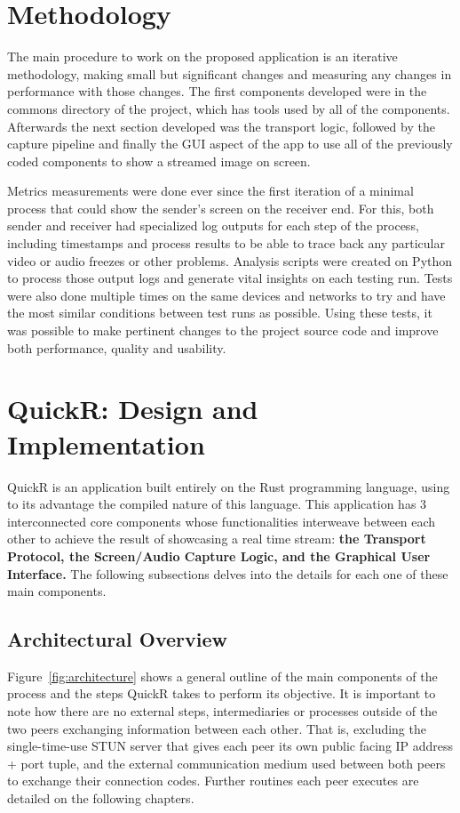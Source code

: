 \documentclass{article}
\begin{document}
\section{Methodology}

The main procedure to work on the proposed application is an iterative methodology, making small but significant changes and measuring any changes in performance with those changes. The first components developed were in the \colorbox{gray!30}{commons} directory of the project, which has tools used by all of the components. Afterwards
the next section developed was the transport logic, followed by the capture pipeline and finally the GUI aspect of the app to use all of the previously coded components to show a streamed image on screen.

Metrics measurements were done ever since the first iteration of a minimal process that could show the sender's screen on the receiver end. For this, both sender and receiver had specialized log outputs for each step of the process, including timestamps and process results to be able to trace back any particular video or audio freezes or other problems. Analysis scripts were created
on Python to process those output logs and generate vital insights on each testing run. Tests were also done multiple times on the same devices and networks to try and have the most similar conditions between test runs as possible. Using these tests, it was possible to make pertinent changes to the project source code and improve both performance, quality and usability.


\section{QuickR: Design and Implementation}

QuickR is an application built entirely on the Rust programming language, using to its advantage the compiled nature of this language. This application has 3 interconnected core components whose functionalities interweave between each other to achieve the result of showcasing a real time stream: 
\textbf{the Transport Protocol, the Screen/Audio Capture Logic, and the Graphical User Interface. } The following subsections delves into the details for each one of these main components.

\subsection{Architectural Overview}
Figure~\ref{fig:architecture} shows a general outline of the main components of the process and the steps QuickR takes to perform its objective. It is important to note how there are no external steps, intermediaries or processes outside of the two peers exchanging information between each other. That is, excluding the
single-time-use STUN server that gives each peer its own public facing IP address + port tuple, and the external communication medium used between both peers to exchange their connection codes. Further routines each peer executes are detailed on the following chapters.
\clearpage
{} 
\end{document}
